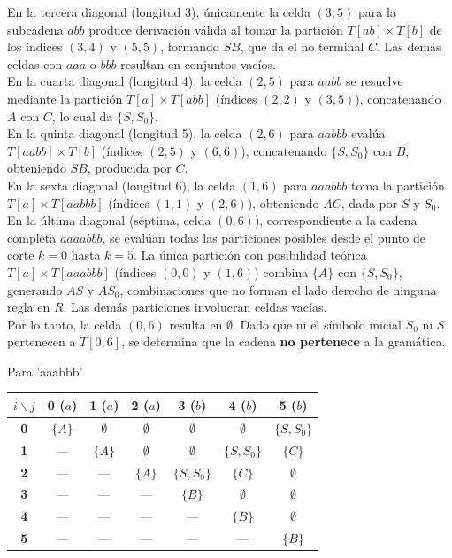 \documentclass[12pt, letterpaper]{article}
\begin{document}
\begin{enumerate}
\begin{enumerate}[label=(\alph*)]
  En la tercera diagonal (longitud 3), únicamente la celda $(3,5)$ para la subcadena $abb$ produce derivación válida al tomar la partición $T[ab] \times T[b]$ de los índices $(3,4)$ y $(5,5)$, formando $SB$, que da el no terminal $C$. Las demás celdas con $aaa$ o $bbb$ resultan en conjuntos vacíos.\\

  En la cuarta diagonal (longitud 4), la celda $(2,5)$ para $aabb$ se resuelve mediante la partición $T[a] \times T[abb]$ (índices $(2,2)$ y $(3,5)$), concatenando $A$ con $C$, lo cual da $\{S, S_0\}$.\\

  En la quinta diagonal (longitud 5), la celda $(2,6)$ para $aabbb$ evalúa $T[aabb] \times T[b]$ (índices $(2,5)$ y $(6,6)$), concatenando $\{S, S_0\}$ con $B$, obteniendo $SB$, producida por $C$.\\

  En la sexta diagonal (longitud 6), la celda $(1,6)$ para $aaabbb$ toma la partición $T[a] \times T[aabbb]$ (índices $(1,1)$ y $(2,6)$), obteniendo $AC$, dada por $S$ y $S_0$.\\

  En la última diagonal (séptima, celda $(0,6)$), correspondiente a la cadena completa $aaaabbb$, se evalúan todas las particiones posibles desde el punto de corte $k=0$ hasta $k=5$. La única partición con posibilidad teórica $T[a] \times T[aaabbb]$ (índices $(0,0)$ y $(1,6)$) combina $\{A\}$ con $\{S, S_0\}$, generando $AS$ y $AS_0$, combinaciones que no forman el lado derecho de ninguna regla en $R$. Las demás particiones involucran celdas vacías.\\

  Por lo tanto, la celda $(0,6)$ resulta en $\emptyset$. Dado que ni el símbolo inicial $S_0$ ni $S$ pertenecen a $T[0,6]$, se determina que la cadena \textbf{no pertenece} a la gramática.
  
  \newpage
  
  Para 'aaabbb'
  \begin{table}[h!]
    \centering
    \begin{tabular}{ccccccc}
      \toprule
      $i \backslash j$ & \textbf{0 ($a$)} & \textbf{1 ($a$)} & \textbf{2 ($a$)} & \textbf{3 ($b$)} & \textbf{4 ($b$)} & \textbf{5 ($b$)} \\
      \midrule
      \textbf{0} & $\{A\}$ & $\emptyset$ & $\emptyset$ & $\emptyset$ & $\emptyset$ & $\{S, S_0\}$\\
      \textbf{1} & — & $\{A\}$ & $\emptyset$ & $\emptyset$ & $\{S, S_0\}$& $\{C\}$ \\
      \textbf{2} & — & — & $\{A\}$ & $\{S, S_0\}$& $\{C\}$ & $\emptyset$ \\
      \textbf{3} & — & — & — & $\{B\}$ & $\emptyset$ & $\emptyset$ \\
      \textbf{4} & — & — & — & — & $\{B\}$ & $\emptyset$ \\
      \textbf{5} & — & — & — & — & — & $\{B\}$ \\
      \bottomrule
    \end{tabular}
  \end{table}


\end{enumerate}
\end{enumerate}
\end{document}

